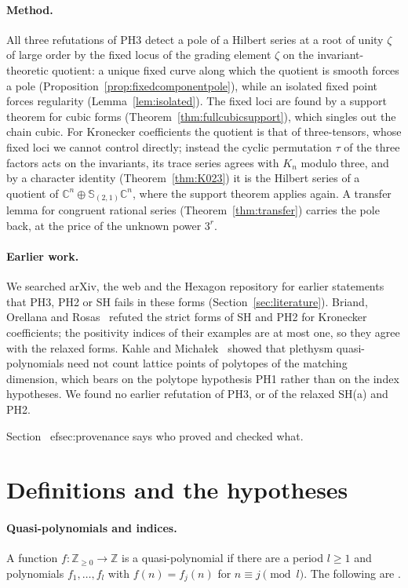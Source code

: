 \documentclass[11pt,a4paper]{article}
\theoremstyle{definition}
\newcommand{\C}{\mathbb{C}}
\newcommand{\Z}{\mathbb{Z}}
\begin{document}
\paragraph{Method.}
All three refutations of PH3 detect a pole of a Hilbert series at a root of
unity $\zeta$ of large order by the fixed locus of the grading element
$\zeta$ on the invariant-theoretic quotient: a unique fixed curve along which
the quotient is smooth forces a pole (Proposition~\ref{prop:fixedcomponentpole}),
while an isolated fixed point forces regularity (Lemma~\ref{lem:isolated}).
The fixed loci are found by a support theorem for cubic forms
(Theorem~\ref{thm:fullcubicsupport}), which singles out the chain cubic. For
Kronecker coefficients the quotient is that of three-tensors, whose fixed loci
we cannot control directly; instead the cyclic permutation $\tau$ of the three
factors acts on the invariants, its trace series agrees with $K_n$ modulo
three, and by a character identity (Theorem~\ref{thm:K023}) it is the Hilbert
series of a quotient of $\C^n\oplus\mathbb S_{(2,1)}\C^n$, where the support
theorem applies again. A transfer lemma for congruent rational series
(Theorem~\ref{thm:transfer}) carries the pole back, at the price of the
unknown power $3^r$.

\paragraph{Earlier work.}
We searched arXiv, the web and the Hexagon repository for earlier statements
that PH3, PH2 or SH fails in these forms (Section~\ref{sec:literature}).
Briand, Orellana and Rosas~\cite{BOR} refuted the strict forms of SH and PH2
for Kronecker coefficients; the positivity indices of their examples are at
most one, so they agree with the relaxed forms. Kahle and Micha\l{}ek~\cite{KM}
showed that plethysm quasi-polynomials need not count lattice points of
polytopes of the matching dimension, which bears on the polytope hypothesis
PH1 rather than on the index hypotheses. We found no earlier refutation of
PH3, or of the relaxed SH(a) and PH2.

Section~
ef{sec:provenance} says who proved and checked what.

\section{Definitions and the hypotheses}\label{sec:defs}

\paragraph{Quasi-polynomials and indices.}
A function $f:\Z_{\ge0}\to\Z$ is a quasi-polynomial if there are a period
$l\ge1$ and polynomials $f_1,\dots,f_l$ with $f(n)=f_j(n)$ for $n\equiv j
\pmod l$. The following are \cite[Definitions 1.2.2 and 1.2.4,
pp.~13--14]{GCT6}.
\end{document}
